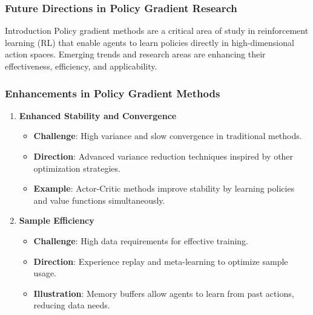 \documentclass[aspectratio=169]{beamer}
\begin{document}
\begin{frame}[fragile]
    \frametitle{Future Directions in Policy Gradient Research}
    \begin{block}{Introduction}
    Policy gradient methods are a critical area of study in reinforcement learning (RL) that enable agents to learn policies directly in high-dimensional action spaces. Emerging trends and research areas are enhancing their effectiveness, efficiency, and applicability.
    \end{block}
\end{frame}

\begin{frame}[fragile]
    \frametitle{Enhancements in Policy Gradient Methods}
    \begin{enumerate}
        \item \textbf{Enhanced Stability and Convergence}
        \begin{itemize}
            \item \textbf{Challenge}: High variance and slow convergence in traditional methods.
            \item \textbf{Direction}: Advanced variance reduction techniques inspired by other optimization strategies.
            \item \textbf{Example}: Actor-Critic methods improve stability by learning policies and value functions simultaneously.
        \end{itemize}
        
        \item \textbf{Sample Efficiency}
        \begin{itemize}
            \item \textbf{Challenge}: High data requirements for effective training.
            \item \textbf{Direction}: Experience replay and meta-learning to optimize sample usage.
            \item \textbf{Illustration}: Memory buffers allow agents to learn from past actions, reducing data needs.
        \end{itemize}
    \end{enumerate}
\end{frame}
\end{document}
